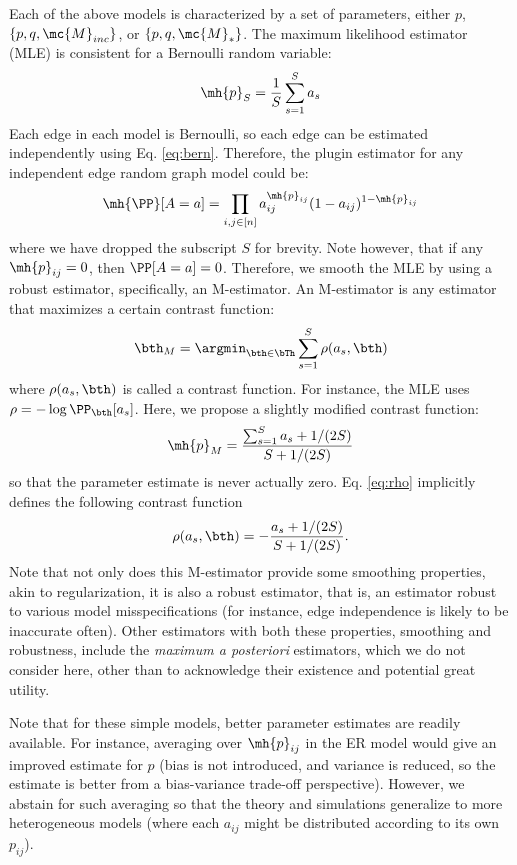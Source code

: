 Each of the above models is characterized by a set of parameters, either $p$, $\{p,q,\mc{M}_{inc}\}$, or $\{p,q,\mc{M}_*\}$.  The maximum likelihood estimator (MLE) is consistent for a Bernoulli random variable:
\begin{align} \label{eq:bern}
	\mh{p}_S = \frac{1}{S} \sum_{s=1}^S a_s
\end{align}
Each edge in each model is Bernoulli, so each edge can be estimated independently using Eq. \eqref{eq:bern}.  Therefore, the plugin estimator for any independent edge random graph model could be:
\begin{align}
	\mh{\PP}[A=a]= \prod_{i,j\in [n]} a_{ij}^{\mh{p}_{ij}}(1-a_{ij})^{1-\mh{p}_{ij}}
\end{align}
where we have dropped the subscript $S$ for brevity.  Note however, that if any $\mh{p}_{ij}=0$, then $\PP[A=a]=0$.  Therefore, we smooth the MLE by using a robust estimator, specifically, an M-estimator.  An M-estimator is any estimator that maximizes a certain contrast function:
\begin{align}
	\bth_M = \argmin_{\bth \in \bTh} \sum_{s=1}^S \rho(a_s, \bth)
\end{align}
 where $\rho(a_s,\bth)$ is called a contrast function. For instance, the MLE uses $\rho=-\log \PP_{\bth}[a_s]$.  Here, we propose a slightly modified contrast function:
\begin{align} \label{eq:rho}
	\mh{p}_M = \frac{\sum_{s=1}^S a_s + 1/(2S)}{S+1/(2S)} 
\end{align}
so that the parameter estimate is never actually zero.   Eq. \eqref{eq:rho} implicitly defines the following contrast function
\begin{align}
\rho(a_s,\bth)=-\frac{a_s+1/(2S)}{S+1/(2S)}.	
\end{align}
Note that not only does this M-estimator provide some smoothing properties, akin to regularization, it is also a robust estimator, that is, an estimator robust to various model misspecifications (for instance, edge independence is likely to be inaccurate often). Other estimators with both these properties, smoothing and robustness, include the \emph{maximum a posteriori} estimators, which we do not consider here, other than to acknowledge their existence and potential great utility.  

Note that for these simple models, better parameter estimates are readily available.  For instance, averaging over $\mh{p}_{ij}$ in the ER model would give an improved estimate for $p$ (bias is not introduced, and variance is reduced, so the estimate is better from a bias-variance trade-off perspective).  However, we abstain for such averaging so that the theory and simulations generalize to more heterogeneous models (where each $a_{ij}$ might be distributed according to its own $p_{ij}$).


